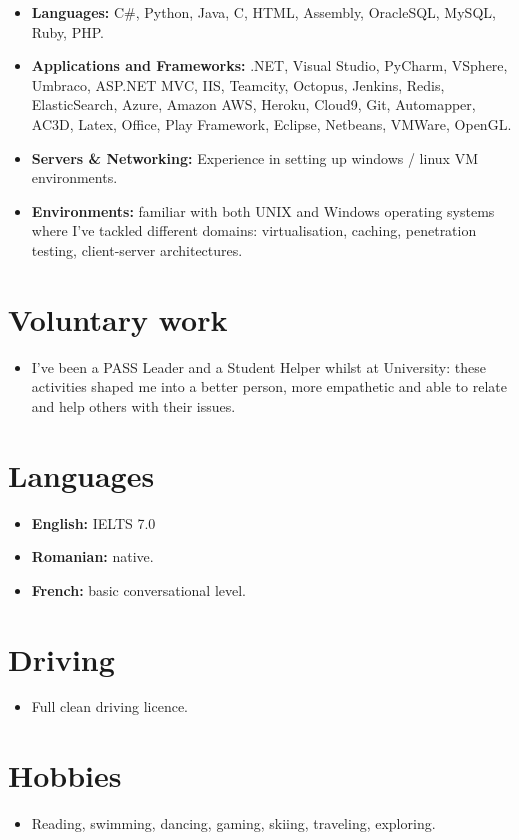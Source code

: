 \documentclass[12pt,a4paper]{res}
\begin{document}
\begin{resume}
\begin{itemize}
  \item[] {\bf Languages:} C\#, Python, Java, C, HTML, Assembly, OracleSQL, MySQL, Ruby, PHP.
  \item[] {\bf Applications and Frameworks:} .NET, Visual Studio, PyCharm, VSphere, Umbraco, ASP.NET MVC, IIS, Teamcity, Octopus, Jenkins, Redis, ElasticSearch, Azure, Amazon AWS, Heroku, Cloud9, Git, Automapper, AC3D, Latex, Office, Play Framework, Eclipse, Netbeans, VMWare, OpenGL.
  \item[] {\bf Servers \& Networking:} Experience in setting up windows / linux VM environments.
  \item[] {\bf Environments:} familiar with both UNIX and Windows operating systems where I've tackled different domains: virtualisation, caching, penetration testing, client-server architectures.
  \end{itemize}
\vspace{-3mm}
      
\section{\large\bf Voluntary work}
\vspace{5mm}
	\begin{itemize}
	\item[] I've been a PASS Leader and a Student Helper whilst at University: these activities shaped me into a better person, more empathetic and able to relate and help others with their issues.
	\end{itemize}
    
\section{Languages}
\vspace{-0.7mm}
\begin{itemize}
\item[] {\bf English:} IELTS 7.0
\item[] {\bf Romanian:} native.
\item[] {\bf French:} basic conversational level.
\end{itemize}
\vspace{-3mm}

\section{Driving}
\vspace{-0.7mm}
\begin{itemize}
\item[] Full clean driving licence.
\end{itemize}
  \vspace{-3mm}
  
\section{Hobbies}
\vspace{-0.7mm}
  \begin{itemize}
  \item[] Reading, swimming, dancing, gaming, skiing, traveling, exploring.
  \end{itemize}

\end{resume}
\end{document}
